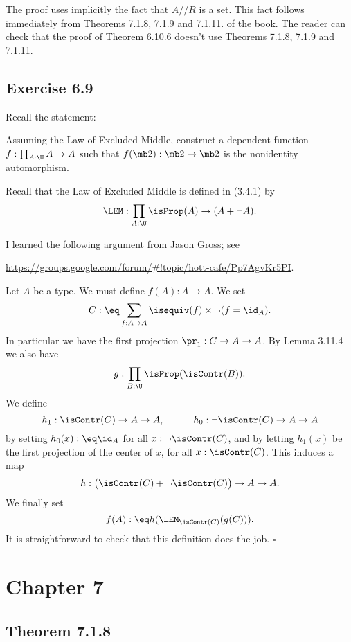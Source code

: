 \documentclass[12pt]{article}
\begin{document}
The proof uses implicitly the fact that $A/\!\!/R$ is a set. This fact follows immediately from Theorems 7.1.8, 7.1.9 and 7.1.11. of the book. The reader can check that the proof of Theorem 6.10.6 doesn't use Theorems 7.1.8, 7.1.9 and 7.1.11.


\subsection{Exercise 6.9}


Recall the statement:

Assuming the Law of Excluded Middle, construct a dependent function $f:\prod_{A:\U}A\to A$ such that $f(\mb2):\mb2\to\mb2$ is the nonidentity automorphism.

Recall that the Law of Excluded Middle is defined in (3.4.1) by 
$$
\LEM:\prod_{A:\U}\isProp(A)\to(A+\neg A).
$$ 

I learned the following argument from Jason Gross; see 

\nn\href{https://groups.google.com/forum/#!topic/hott-cafe/Pp7AgvKr5PI}{https://groups.google.com/forum/\#!topic/hott-cafe/Pp7AgvKr5PI}.

Let $A$ be a type. We must define $f(A):A\to A$. We set 
$$
C:\eq\sum_{f:A\to A}\isequiv(f)\times\neg(f=\id_A).
$$ 
In particular we have the first projection $\pr_1:C\to A\to A$. By Lemma 3.11.4 we also have 
$$
g:\prod_{B:\U}\isProp(\isContr(B)).
$$ 
We define 
$$
h_1:\isContr(C)\to A\to A,\qquad\quad h_0:\neg\isContr(C)\to A\to A
$$ 
by setting $h_0(x):\eq\id_A$ for all $x:\neg\isContr(C)$, and by letting $h_1(x)$ be the first projection of the center of $x$, for all $x:\isContr(C)$. This induces a map 
$$
h:\big(\isContr(C)+\neg\isContr(C)\big)\to A\to A.
$$ 
We finally set 
$$
f(A):\eq h(\LEM_{\isContr(C)}(g(C))).
$$
It is straightforward to check that this definition does the job. $\square$


\section{Chapter 7}

\subsection{Theorem 7.1.8}\label{718}
\end{document}
